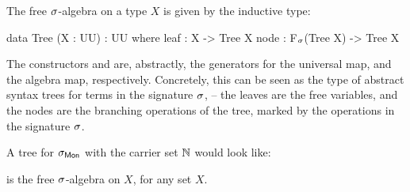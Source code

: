\begin{definition}\label{algebra:tree}
    \label{def:free-algebra-construction}
    The free $\sigma$-algebra on a type $X$ is given by the inductive type:
    \begin{code}
data Tree (X : UU) : UU where
  leaf : X -> Tree X
  node : F$_\sigma$(Tree X) -> Tree X
    \end{code}
\end{definition}
The constructors  and  are, abstractly,
the generators for the universal map, and the algebra map, respectively.
%
Concretely, this can be seen as the type of abstract syntax trees for terms in the signature $\sigma$,
-- the leaves are the free variables, and the nodes are the branching operations of the tree,
marked by the operations in the signature $\sigma$.

\begin{example}
A tree for $\sigma_{\mathsf{Mon}}$ with the carrier set $\mathbb{N}$ would look like:
\begin{center}
\hspace{2em}
\end{center}
\end{example}

\begin{proposition}
    \label{prop:free-algebra-construction-is}
     is the free $\sigma$-algebra on $X$, for any set $X$.
\end{proposition}

